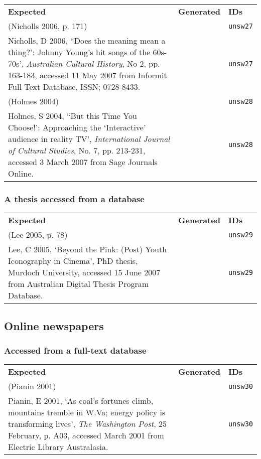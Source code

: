 \documentclass[a4paper,landscape,12pt]{article}
\newlength\q
\newlength\qr
\newenvironment{citetable}
  {\noindent\begin{longtable}{p{\q} p{\q} p{\qr}}\textbf{Expected} & \textbf{Generated} & \textbf{IDs}\\}
  {\end{longtable}}
\newcommand{\majorissue}[1]{\textcolor{red}{#1}}
\begin{document}
\begin{citetable}
	(Nicholls 2006, p. 171) & \parencite[p.~171]{unsw27} & \texttt{unsw27} \\
	Nicholls, D 2006, ``Does the meaning mean a thing?': Johnny Young's hit songs of the 60s-70s', \textit{Australian Cultural History}, No 2, pp. 163-183, accessed 11 May 2007 from Informit Full Text Database, ISSN; 0728-8433. & \majorissue{\fullcite{unsw27}} & \texttt{unsw27} \\
	(Holmes 2004) & \parencite{unsw28} & \texttt{unsw28} \\
	Holmes, S 2004, ``But this Time You Choose!': Approaching the `Interactive' audience in reality TV', \textit{International Journal of Cultural Studies}, No. 7, pp. 213-231, accessed 3 March 2007 from Sage Journals Online. & \majorissue{\fullcite{unsw28}} & \texttt{unsw28} \\
\end{citetable}

\subsubsection{A thesis accessed from a database} 

\begin{citetable}
	(Lee 2005, p. 78) & \parencite[p.~78]{unsw29} & \texttt{unsw29} \\
	Lee, C 2005, `Beyond the Pink: (Post) Youth Iconography in Cinema', PhD thesis, Murdoch University, accessed 15 June 2007 from Australian Digital Thesis Program Database. & \majorissue{\fullcite{unsw29}} & \texttt{unsw29} \\
\end{citetable}

\subsection{Online newspapers}

\subsubsection{Accessed from a full-text database}

\begin{citetable}
	(Pianin 2001) & \parencite{unsw30} & \texttt{unsw30} \\
	Pianin, E 2001, `As coal's fortunes climb, mountains tremble in W.Va; energy policy is transforming lives', \textit{The Washington Post}, 25 February, p. A03, accessed March 2001 from Electric Library Australasia. & \majorissue{\fullcite{unsw30}} & \texttt{unsw30} \\
\end{citetable}
\end{document}
